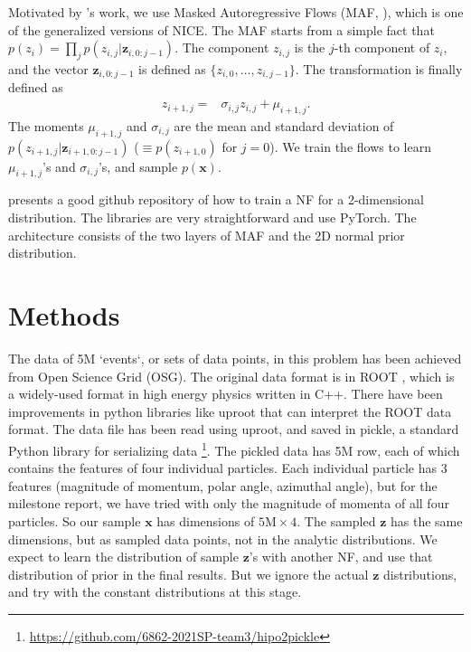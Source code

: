 Motivated by \citet{stan}'s work, we use Masked Autoregressive Flows (MAF, \citet{papamakarios2018masked}), which is one of the generalized versions of NICE. The MAF starts from a simple fact that $p(z_{i}) = \prod\limits_{j}p(z_{i,j}|\mathbf{z}_{i,0:j-1})$. The component $z_{i,j}$ is the $j$-th component of $z_i$, and the vector $\mathbf{z}_{i,0:j-1}$ is defined as $\{z_{i, 0}, ..., z_{i, j-1}\}$. The transformation is finally defined as
\begin{align}
    z_{i+1, j}=& \sigma_{i, j} z_{i, j} + \mu_{i+1, j}.
\end{align}
The moments $\mu_{i+1, j}$ and $\sigma_{i, j}$ are the mean and standard deviation of $p(z_{i+1,j}|\mathbf{z}_{i+1,0:j-1})$ ($\equiv p(z_{i+1,0})$ for $j=0$). We train the flows to learn $\mu_{i+1, j}$'s and $\sigma_{i, j}$'s, and sample $p(\mathbf{x})$.

\citet{papamakarios2018masked} presents a good github repository of how to train a NF for a 2-dimensional distribution. The libraries are very straightforward and use PyTorch. The architecture consists of the two layers of MAF and the 2D normal prior distribution.

\section{Methods}
The data of 5M `events`, or sets of data points, in this problem has been achieved from Open Science Grid (OSG). The original data format is in ROOT \cite{root}, which is a widely-used format in high energy physics written in C++. There have been improvements in python libraries like uproot \cite{uproot} that can interpret the ROOT data format. The data file has been read using uproot, and saved in pickle, a standard Python library for serializing data \footnote{\url{https://github.com/6862-2021SP-team3/hipo2pickle}}. The pickled data has 5M row, each of which contains the features of four individual particles. Each individual particle has 3 features (magnitude of momentum, polar angle, azimuthal angle), but for the milestone report, we have tried with only the magnitude of momenta of all four particles. So our sample $\mathbf{x}$ has dimensions of $5\text{M}\times4$. The sampled $\mathbf{z}$ has the same dimensions, but as sampled data points, not in the analytic distributions.  We expect to learn the distribution of sample $\mathbf{z}$'s with another NF, and use that distribution of prior in the final results. But we ignore the actual $\mathbf{z}$ distributions, and try with the constant distributions at this stage.

